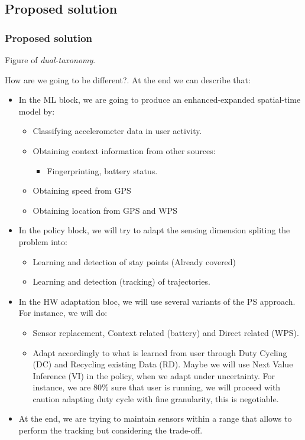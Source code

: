 \documentclass[compress,9pt,xcolor={dvipsnames,table}]{beamer}
\begin{document}
\subsection{Proposed solution}
\begin{frame}[t]\frametitle{Proposed solution}
Figure of \emph{dual-taxonomy}.

How are we going to be different?.
At the end we can describe that:
\begin{itemize}
  \item In the ML block, we are going to produce an enhanced-expanded spatial-time model by:
  \begin{itemize}
    \item Classifying accelerometer data in user activity.
    \item Obtaining context information from other sources:
    \begin{itemize}
      \item Fingerprinting, battery status.
    \end{itemize}
    \item Obtaining speed from GPS
    \item Obtaining location from GPS and WPS
  \end{itemize}
  \item In the policy block, we will try to adapt the sensing dimension spliting the problem into:
  \begin{itemize}
    \item Learning and detection of stay points (Already covered)
    \item Learning and detection (tracking) of trajectories.
  \end{itemize}
  \item In the HW adaptation bloc, we will use several variants of the PS approach.
  For instance, we will do:
  \begin{itemize}
    \item Sensor replacement, Context related (battery) and Direct related (WPS).
    \item Adapt accordingly to what is learned from user through Duty Cycling (DC) and Recycling existing Data (RD).
    Maybe we will use Next Value Inference (VI) in the policy, when we adapt under uncertainty.
    For instance, we are 80\% sure that user is running, we will proceed with caution adapting duty cycle with fine granularity, this is negotiable.
  \end{itemize}
  \item At the end, we are trying to maintain sensors within a range that allows to perform the tracking but considering the trade-off.
\end{itemize}
\end{frame}
\end{document}
